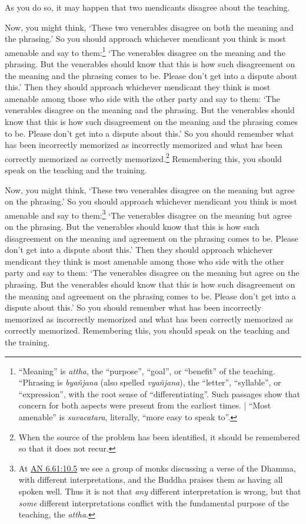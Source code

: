 \documentclass[12pt,openany]{book}%
\begin{document}
As you do so, it may happen that two mendicants disagree about the teaching. 

Now, you might think, ‘These two venerables disagree on both the meaning and the phrasing.’ So you should approach whichever mendicant you think is most amenable and say to them:\footnote{“Meaning” is \textit{attha}, the “purpose”, “goal”, or “benefit” of the teaching. “Phrasing is \textit{\textsanskrit{byañjana}} (also spelled \textit{\textsanskrit{vyañjana}}), the “letter”, “syllable”, or “expression”, with the root sense of “differentiating”. Such passages show that concern for both aspects were present from the earliest times. | “Most amenable” is \textit{suvacatara}, literally, “more easy to speak to”. } ‘The venerables disagree on the meaning and the phrasing. But the venerables should know that this is how such disagreement on the meaning and the phrasing comes to be. Please don’t get into a dispute about this.’ Then they should approach whichever mendicant they think is most amenable among those who side with the other party and say to them: ‘The venerables disagree on the meaning and the phrasing. But the venerables should know that this is how such disagreement on the meaning and the phrasing comes to be. Please don’t get into a dispute about this.’ So you should remember what has been incorrectly memorized as incorrectly memorized and what has been correctly memorized as correctly memorized.\footnote{When the source of the problem has been identified, it should be remembered so that it does not recur. } Remembering this, you should speak on the teaching and the training. 

Now, you might think, ‘These two venerables disagree on the meaning but agree on the phrasing.’ So you should approach whichever mendicant you think is most amenable and say to them:\footnote{At \href{https://suttacentral.net/an6.61/en/sujato\#10.5}{AN 6.61:10.5} we see a group of monks discussing a verse of the Dhamma, with different interpretations, and the Buddha praises them as having all spoken well. Thus it is not that \emph{any} different interpretation is wrong, but that \emph{some} different interpretations conflict with the fundamental purpose of the teaching, the \textit{attha}. } ‘The venerables disagree on the meaning but agree on the phrasing. But the venerables should know that this is how such disagreement on the meaning and agreement on the phrasing comes to be. Please don’t get into a dispute about this.’ Then they should approach whichever mendicant they think is most amenable among those who side with the other party and say to them: ‘The venerables disagree on the meaning but agree on the phrasing. But the venerables should know that this is how such disagreement on the meaning and agreement on the phrasing comes to be. Please don’t get into a dispute about this.’ So you should remember what has been incorrectly memorized as incorrectly memorized and what has been correctly memorized as correctly memorized. Remembering this, you should speak on the teaching and the training. 
\end{document}
